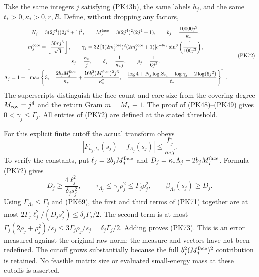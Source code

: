 \documentclass[11pt]{article}
\begin{document}
Take the same integers \(j\) satisfying (PK43b), the same labels \(h_j\),
and the same \(t_*>0,\kappa_*>0,r,R\). Define, without dropping any factors,
\[
 \begin{gathered}
 N_j=3(2j^4)(2j^4+1)^2,\qquad
 M_j^{\rm face}=3(2j^4)^2(2j^4+1),\qquad
 b_j=\frac{10000j^2}{\kappa_*},\\
 m_j^{\rm core}=\left\lfloor\frac{50rj^3}{\sqrt3}\right\rfloor,\qquad
 \gamma_j=32\,[3(2m_j^{\rm core})^2(2m_j^{\rm core}+1)]
       e^{-6t_*}\sin^8\left(\frac1{100j^3}\right),\\
 s_j=\frac{\kappa_*}{j},\qquad
 \delta_j=\frac1{\kappa_*j},\qquad
 \rho_j=\frac1{6j^2},\\
 \Lambda_j=
 1+\left\lceil\max\left\{
 3,\quad
 \frac{2b_jM_j^{\rm face}}{\kappa_*}
       +\frac{16b_j^2(M_j^{\rm face})^2j^3}{\kappa_*^2},
 \quad
 \frac{\log4+N_j\log\mathcal Z_{t_*}
                   -\log\gamma_j+2\log(6j^2)}{t_*}
 \right\}\right\rceil .
 \end{gathered}\tag{PK72}
\]
The superscripts distinguish the face count and core size from the
covering degree \(M_{\rm cov}=j^4\) and the return Gram \(m=M_L-1\).
The proof of (PK48)–(PK49) gives \(0<\gamma_j\le\Gamma_j\).
All entries of (PK72) are defined at the stated threshold.

For this explicit finite cutoff the actual transform obeys
\[
 \left|F_{h_j,t_*}(s_j)-f_{\Lambda_j}(s_j)\right|
       \le\frac{\Gamma_j}{\kappa_*j}.
 \tag{PK73}
\]
To verify the constants, put \(\ell_j=2b_jM_j^{\rm face}\) and
\(D_j=\kappa_*\Lambda_j-2b_jM_j^{\rm face}\). Formula (PK72) gives
\[
 D_j\ge\frac{4\ell_j^2}{\delta_js_j^2},\qquad
 \tau_{\Lambda_j}\le\gamma_j\rho_j^2\le\Gamma_j\rho_j^2,\qquad
 \beta_{\Lambda_j}(s_j)\ge D_j .
 \]
Using \(\Gamma_{\Lambda_j}\le\Gamma_j\) and (PK69), the first and third
terms of (PK71) together are at most
\(2\Gamma_j\ell_j^2/(D_js_j^2)\le\delta_j\Gamma_j/2\).
The second term is at most
\(\Gamma_j(2\rho_j+\rho_j^2)/s_j
\le3\Gamma_j\rho_j/s_j=\delta_j\Gamma_j/2\).
Adding proves (PK73). This is an error measured against the original
raw norm; the measure and vectors have not been redefined.
The cutoff grows substantially because the full
\(b_j^2(M_j^{\rm face})^2\) contribution is retained. No feasible matrix
size or evaluated small-energy mass at these cutoffs is asserted.
\end{document}
